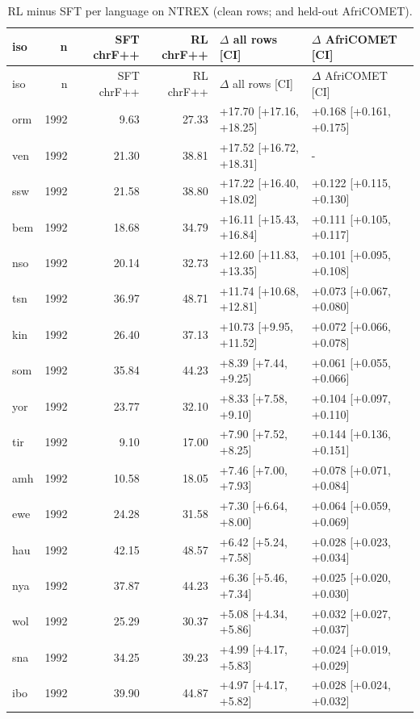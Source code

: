 {\scriptsize
\setlength{\tabcolsep}{4pt}
\begin{longtable}{@{}lrrrll@{}}
\caption{RL minus SFT per language on NTREX (clean rows; \chrfpp{} and held-out AfriCOMET).}\label{tab:perlang_ntrex}\\
\toprule
iso & n & SFT chrF++ & RL chrF++ & $\Delta$ all rows [CI] & $\Delta$ AfriCOMET [CI] \\
\midrule\endfirsthead
\toprule
iso & n & SFT chrF++ & RL chrF++ & $\Delta$ all rows [CI] & $\Delta$ AfriCOMET [CI] \\
\midrule\endhead
\bottomrule\endlastfoot
orm & 1992 & 9.63 & 27.33 & +17.70 [+17.16, +18.25] & +0.168 [+0.161, +0.175] \\
ven & 1992 & 21.30 & 38.81 & +17.52 [+16.72, +18.31] & - \\
ssw & 1992 & 21.58 & 38.80 & +17.22 [+16.40, +18.02] & +0.122 [+0.115, +0.130] \\
bem & 1992 & 18.68 & 34.79 & +16.11 [+15.43, +16.84] & +0.111 [+0.105, +0.117] \\
nso & 1992 & 20.14 & 32.73 & +12.60 [+11.83, +13.35] & +0.101 [+0.095, +0.108] \\
tsn & 1992 & 36.97 & 48.71 & +11.74 [+10.68, +12.81] & +0.073 [+0.067, +0.080] \\
kin & 1992 & 26.40 & 37.13 & +10.73 [+9.95, +11.52] & +0.072 [+0.066, +0.078] \\
som & 1992 & 35.84 & 44.23 & +8.39 [+7.44, +9.25] & +0.061 [+0.055, +0.066] \\
yor & 1992 & 23.77 & 32.10 & +8.33 [+7.58, +9.10] & +0.104 [+0.097, +0.110] \\
tir & 1992 & 9.10 & 17.00 & +7.90 [+7.52, +8.25] & +0.144 [+0.136, +0.151] \\
amh & 1992 & 10.58 & 18.05 & +7.46 [+7.00, +7.93] & +0.078 [+0.071, +0.084] \\
ewe & 1992 & 24.28 & 31.58 & +7.30 [+6.64, +8.00] & +0.064 [+0.059, +0.069] \\
hau & 1992 & 42.15 & 48.57 & +6.42 [+5.24, +7.58] & +0.028 [+0.023, +0.034] \\
nya & 1992 & 37.87 & 44.23 & +6.36 [+5.46, +7.34] & +0.025 [+0.020, +0.030] \\
wol & 1992 & 25.29 & 30.37 & +5.08 [+4.34, +5.86] & +0.032 [+0.027, +0.037] \\
sna & 1992 & 34.25 & 39.23 & +4.99 [+4.17, +5.83] & +0.024 [+0.019, +0.029] \\
ibo & 1992 & 39.90 & 44.87 & +4.97 [+4.17, +5.82] & +0.028 [+0.024, +0.032] \\

\end{longtable}}
